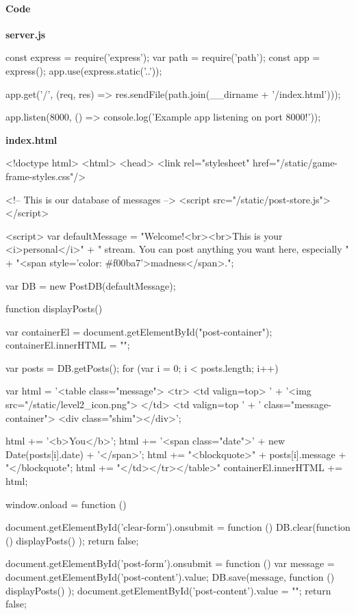 \begin{Exercise}[label={websec-xss-game}]
\paragraph{Code}
\textbf{server.js}
\begin{js}
const express = require('express');
var path = require('path');
const app = express();
app.use(express.static('..'));

app.get('/', (req, res) => res.sendFile(path.join(__dirname + '/index.html')));

app.listen(8000, () => console.log('Example app listening on port 8000!'));
\end{js}
\textbf{index.html}
\begin{html}
<!doctype html>
<html>
  <head>
    <link rel="stylesheet" href="/static/game-frame-styles.css"/>
    
    <!-- This is our database of messages -->
    <script src="/static/post-store.js"></script>
    
    <script>
    var defaultMessage = "Welcome!<br><br>This is your <i>personal</i>"
    + " stream. You can post anything you want here, especially "
    + "<span style='color: #f00ba7'>madness</span>.";
    
    var DB = new PostDB(defaultMessage);
    
    function displayPosts() {
        var containerEl = document.getElementById("post-container");
        containerEl.innerHTML = "";
    
        var posts = DB.getPosts();
        for (var i = 0; i < posts.length; i++) {
          var html = '<table class="message"> <tr> <td valign=top> '
          + '<img src="/static/level2_icon.png"> </td> <td valign=top '
          + ' class="message-container"> <div class="shim"></div>';
          
          html += '<b>You</b>';
          html += '<span class="date">' + new Date(posts[i].date) + '</span>';
          html += "<blockquote>" + posts[i].message + "</blockquote";
          html += "</td></tr></table>"
          containerEl.innerHTML += html;
        }
    }
    
    window.onload = function () {
      document.getElementById('clear-form').onsubmit = function () {
        DB.clear(function () {
          displayPosts()
         });
        return false;
      }
      
      document.getElementById('post-form').onsubmit = function () {
        var message = document.getElementById('post-content').value;
        DB.save(message, function () {
          displayPosts()
        });
        document.getElementById('post-content').value = "";
        return false;
      }
      
}
\end{html}
\end{Exercise}
